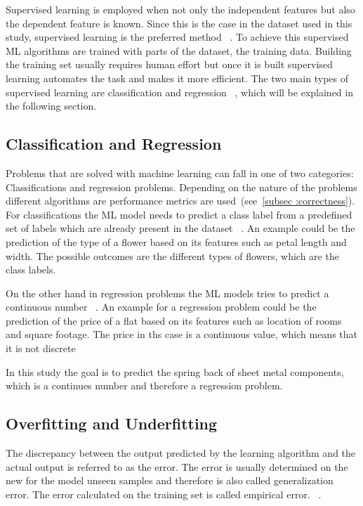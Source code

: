 Supervised learning is employed when not only the independent features but also the dependent feature is known.
Since this is the case in the dataset used in this study, supervised learning is the preferred
method
~\cite[p. 2]{muller_introductionmachinelearning_2016}.
To achieve this supervised \ac{ML} algorithms are trained with parts of the dataset, the training data.
Building the training set usually requires human effort but once it is built supervised learning automates the task
and makes it more efficient.
The two main types of supervised learning are classification and regression
~\cite[p. 25]{muller_introductionmachinelearning_2016}, which will be explained in the following section.

\subsection{Classification and Regression}\label{subsec:regression}
Problems that are solved with machine learning can fall in one of two categories: Classifications and regression
problems.
Depending on the nature of the problems different algorithms are performance metrics are used~(see~\cref{subsec
:correctness}).
For classifications the ML model needs to predict a class label from a predefined set of labels which are already
present in the dataset
~\cite[pp. 25--26]{muller_introductionmachinelearning_2016}.
An example could be the prediction of the type of a flower based on its features such as
petal length and width.
The possible outcomes are the different types of flowers, which are the class labels.

On the other hand in regression problems the ML models tries to predict a continuous number
~\cite[pp. 25--26]{muller_introductionmachinelearning_2016}.
An example for a regression problem could be the prediction of the price of a flat based on its features such as
location of rooms and square footage.
The price in ths case is a continuous value, which means that it is not discrete

In this study the goal is to predict the spring back of sheet metal components, which is a continues number and
therefore a regression problem.

\subsection{Overfitting and Underfitting}\label{subsec:overfitting-and-underfitting}
The discrepancy between the output predicted by the learning algorithm and the actual output is referred to as the
error.
The error is usually determined on the new for the model unseen samples and therefore is also
called generalization error.
The error calculated on the training set is called empirical error.
~\cite[p. 26]{zhou_machinelearning_2021}.

